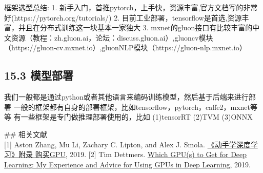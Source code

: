 框架选型总结: 1.
新手入门，首推pytorch，上手快，资源丰富,官方文档写的非常好(https://pytorch.org/tutorials/)
2.
目前工业部署，tensorflow是首选,资源丰富，并且在分布式训练这一块基本一家独大
3.
mxnet的gluon接口有比较丰富的中文资源（教程：zh.gluon.ai，论坛：discuss.gluon.ai）,gluoncv模块（https://gluon-cv.mxnet.io）,gluonNLP模块（https://gluon-nlp.mxnet.io）

\subsection{15.3 模型部署}\label{ux6a21ux578bux90e8ux7f72}

我们一般都是通过python或者其他语言来编码训练模型，然后基于后端来进行部署
一般的框架都有自身的部署框架，比如tensorflow，pytorch，caffe2，mxnet等等
有一些框架是专门做推理部署使用的，比如 (1)tensorRT (2)TVM (3)ONNX

\#\# 相关文献\\
{[}1{]} Aston Zhang, Mu Li, Zachary C. Lipton, and Alex J. Smola.
\href{https://github.com/d2l-ai/d2l-zh/blob/master/chapter_appendix/buy-gpu.md}{《动手学深度学习》附录
购买GPU}, 2019. {[}2{]} Tim Dettmers.
\href{http://timdettmers.com/2019/04/03/which-gpu-for-deep-learning/}{Which
GPU(s) to Get for Deep Learning: My Experience and Advice for Using GPUs
in Deep Learning}, 2019.
